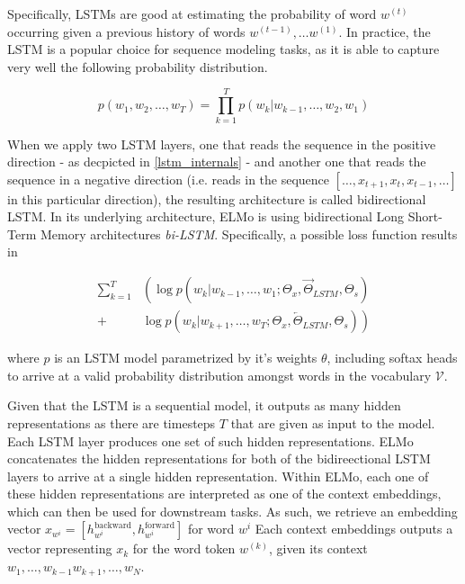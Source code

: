 \documentclass[a4paper,12pt,twoside,openright]{report}
\begin{document}
Specifically, LSTMs \cite{hochreiter97} are good at estimating the probability of word $w^{(t)}$ occurring given a previous history of words $w^{(t-1)}, \ldots w^{(1)}$.
In practice, the LSTM is a popular choice for sequence modeling tasks, as it is able to capture very well the following probability distribution.

\begin{equation}
p\left(w_{1},  w_{2}, \ldots, w_{T} \right)=\prod_{k=1}^{T} p\left(w_{k} | w_{k-1}, \ldots, w_{2}, w_{1}\right)
\end{equation}

When we apply two LSTM layers, one that reads the sequence in the positive direction - as decpicted in \eqref{lstm_internals} - and another one that reads the sequence in a negative direction (i.e. reads in the sequence $[\ldots, x_{t+1}, x_t, x_{t-1}, \ldots]$ in this particular direction), the resulting architecture is called bidirectional LSTM.
In its underlying architecture, ELMo is using bidirectional Long Short-Term Memory architectures \textit{bi-LSTM}.
Specifically, a possible loss function results in 

\begin{align} 
\sum_{k=1}^{T} &\left(\log p\left(w_{k} | w_{k-1}, \ldots, w_{1} ; \Theta_{x}, \vec{\Theta}_{L S T M}, \Theta_{s}\right)\right.\\
+&\left.\log p\left(w_{k} | w_{k+1}, \ldots, w_{T}; \Theta_{x}, \overleftarrow{\Theta}_{L S T M}, \Theta_{s}\right)\right) 
\end{align}

where $p$ is an LSTM model parametrized by it's weights $\theta$, including softax heads to arrive at a valid probability distribution amongst words in the vocabulary $\mathcal{V}$.

Given that the LSTM is a sequential model, it outputs as many hidden representations as there are timesteps $T$ that are given as input to the model. 
Each LSTM layer produces one set of such hidden representations.
ELMo concatenates the hidden representations for both of the bidireectional LSTM layers to arrive at a single hidden representation.
Within ELMo, each one of these hidden representations are interpreted as one of the context embeddings, which can then be used for downstream tasks.
As such, we retrieve an embedding vector $x_{w^i} = [h^\text{backward}_{w^i}, h^\text{forward}_{w^i}]$ for word $w^i$
Each context embeddings outputs a vector representing $x_{k}$ for the word token $w^{(k)}$, given its context $ w_{1}, \ldots, w_{k-1}  w_{k+1}, \ldots, w_{N}$.
\end{document}
